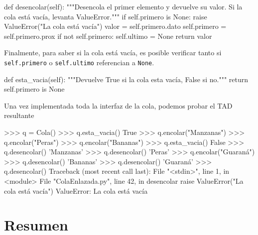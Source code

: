 \begin{codigo-python-sn}
    def desencolar(self):
        """Desencola el primer elemento y devuelve su valor.
           Si la cola está vacía, levanta ValueError."""
        if self.primero is None:
            raise ValueError("La cola está vacía")
        valor = self.primero.dato
        self.primero = self.primero.prox
        if not self.primero:
            self.ultimo = None
        return valor
\end{codigo-python-sn}

Finalmente, para saber si la cola está vacía, es posible verificar tanto si
\lstinline!self.primero! o \lstinline!self.ultimo! referencian a
\lstinline!None!.

\begin{codigo-python-sn}
    def esta_vacia(self):
        """Devuelve True si la cola esta vacía, False si no."""
        return self.primero is None
\end{codigo-python-sn}

Una vez implementada toda la interfaz de la cola, podemos probar el TAD
resultante

\begin{codigo-python-sn}
>>> q = Cola()
>>> q.esta_vacia()
True
>>> q.encolar("Manzanas")
>>> q.encolar("Peras")
>>> q.encolar("Bananas")
>>> q.esta_vacia()
False
>>> q.desencolar()
'Manzanas'
>>> q.desencolar()
'Peras'
>>> q.encolar("Guaraná")
>>> q.desencolar()
'Bananas'
>>> q.desencolar()
'Guaraná'
>>> q.desencolar()
Traceback (most recent call last):
  File "<stdin>", line 1, in <module>
  File "ColaEnlazada.py", line 42, in desencolar
    raise ValueError("La cola está vacía")
ValueError: La cola está vacía
\end{codigo-python-sn}


\section{Resumen}

